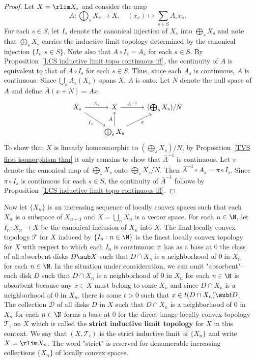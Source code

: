 \begin{proof}
Let $X=\rlim X_s$ and consider the map
\[A:\bigoplus_sX_s\to X,\quad (x_s)\mapsto\sum_{s\in S}A_sx_s.\]
For each $s\in S$, let $I_s$ denote the canonical injection of $X_s$ into $\bigoplus_sX_s$ and note that $\bigoplus_sX_s$ carries the inductive limit topology determined by the canonical injection $\{I_s:s\in S\}$. Note also that $A\circ I_s=A_s$ for each $s\in S$. By Proposition~\ref{LCS inductive limit topo continuous iff}, the continuity of $A$ is equivalent to that of $A\circ I_s$ for each $s\in S$. Thus, since each $A_s$ is continuous, $A$ is continuous. Since $\bigcup_sA_s(X_s)$ spans $X$, $A$ is onto. Let $N$ denote the null space of $A$ and define $\bar{A}(x+N)=Ax$.
\[\begin{tikzcd}
X_s\ar[r,"A_s"]\ar[rd,swap,"I_s"]&X\ar[r,"\bar{A}^{-1}"]&(\bigoplus_sX_s)/N\\
&\bigoplus_sX_s\ar[ru,swap,"\pi"]\ar[u,"A"]&
\end{tikzcd}\]
To show that $X$ is linearly homeomorphic to $(\bigoplus_sX_s)/N$, by Proposition~\ref{TVS first isomorphism thm} it only remains to show that $\bar{A}^{-1}$ is continuous. Let $\pi$ denote the canonical map of $\bigoplus_sX_s$ onto $\bigoplus_sX_s/N$. Then $\bar{A}^{-1}\circ A_s=\pi\circ I_s$. Since $\pi\circ I_s$ is continuous for each $s\in S$, the continuity of $\bar{A}^{-1}$ follows by Proposition~\ref{LCS inductive limit topo continuous iff}.
\end{proof}
Now let $\{X_n\}$ is an increasing sequence of locally convex spaces such that each $X_n$ is a subspace of $X_{n+1}$ and $X=\bigcup_nX_n$ is a vector space. For each $n\in\N$, let $I_n:X_n\to X$ be the canonical inclusion of $X_n$ into $X$. The final locally convex topology $\mathcal{T}$ for $X$ induced by $\{I_n:n\in\N\}$ is the finest locally convex topology for $X$ with respect to which each $I_n$ is continuous; it has as a base at $0$ the class of all absorbent disks $D\sub X$ such that $D\cap X_n$ is a neighborhood of $0$ in $X_n$ for each $n\in\N$. In the situation under consideration, we can omit "absorbent"--each disk $D$ such that $D\cap X_n$ is a neighborhood of $0$ in $X_n$ for each $n\in\N$ is absorbent because any $x\in X$ must belong to some $X_n$ and since $D\cap X_n$ is a neighborhood of $0$ in $X_n$, there is some $t>0$ such that $x\in t(D\cap X_n)\sub tD$. The collection $\mathcal{D}$ of all disks $D$ in $X$ such that $D\cap X_n$ is a neighborhood of $0$ in $X_n$ for each $n\in\N$ forms a base at $0$ for the direct image locally convex topology $\mathcal{T}_i$ on $X$ which is called the \textbf{strict inductive limit topology} for $X$ in this context. We say that $(X,\mathcal{T}_i)$ is the strict inductive limit of $\{X_n\}$ and write $X=\rlim X_n$. The word "strict" is reserved for denumerable increasing collections $\{X_n\}$ of locally convex spaces.
